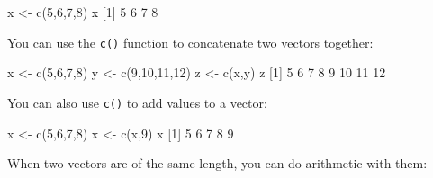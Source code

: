 \documentclass[
]{book}
\newenvironment{Shaded}{\begin{snugshade}}{\end{snugshade}}
\newcommand{\DecValTok}[1]{\textcolor[rgb]{0.00,0.00,0.81}{#1}}
\newcommand{\FunctionTok}[1]{\textcolor[rgb]{0.00,0.00,0.00}{#1}}
\newcommand{\NormalTok}[1]{#1}
\newcommand{\OtherTok}[1]{\textcolor[rgb]{0.56,0.35,0.01}{#1}}
\begin{document}
\begin{Shaded}
\begin{Highlighting}[]
\NormalTok{x }\OtherTok{\textless{}{-}} \FunctionTok{c}\NormalTok{(}\DecValTok{5}\NormalTok{,}\DecValTok{6}\NormalTok{,}\DecValTok{7}\NormalTok{,}\DecValTok{8}\NormalTok{)}
\NormalTok{x}
\NormalTok{[}\DecValTok{1}\NormalTok{] }\DecValTok{5} \DecValTok{6} \DecValTok{7} \DecValTok{8}
\end{Highlighting}
\end{Shaded}

You can use the \texttt{c()} function to concatenate two vectors together:

\begin{Shaded}
\begin{Highlighting}[]
\NormalTok{x }\OtherTok{\textless{}{-}} \FunctionTok{c}\NormalTok{(}\DecValTok{5}\NormalTok{,}\DecValTok{6}\NormalTok{,}\DecValTok{7}\NormalTok{,}\DecValTok{8}\NormalTok{)}
\NormalTok{y }\OtherTok{\textless{}{-}} \FunctionTok{c}\NormalTok{(}\DecValTok{9}\NormalTok{,}\DecValTok{10}\NormalTok{,}\DecValTok{11}\NormalTok{,}\DecValTok{12}\NormalTok{)}
\NormalTok{z }\OtherTok{\textless{}{-}} \FunctionTok{c}\NormalTok{(x,y)}
\NormalTok{z}
\NormalTok{[}\DecValTok{1}\NormalTok{]  }\DecValTok{5}  \DecValTok{6}  \DecValTok{7}  \DecValTok{8}  \DecValTok{9} \DecValTok{10} \DecValTok{11} \DecValTok{12}
\end{Highlighting}
\end{Shaded}

You can also use \texttt{c()} to add values to a vector:

\begin{Shaded}
\begin{Highlighting}[]
\NormalTok{x }\OtherTok{\textless{}{-}} \FunctionTok{c}\NormalTok{(}\DecValTok{5}\NormalTok{,}\DecValTok{6}\NormalTok{,}\DecValTok{7}\NormalTok{,}\DecValTok{8}\NormalTok{)}
\NormalTok{x }\OtherTok{\textless{}{-}} \FunctionTok{c}\NormalTok{(x,}\DecValTok{9}\NormalTok{)}
\NormalTok{x}
\NormalTok{[}\DecValTok{1}\NormalTok{] }\DecValTok{5} \DecValTok{6} \DecValTok{7} \DecValTok{8} \DecValTok{9}
\end{Highlighting}
\end{Shaded}

When two vectors are of the same length, you can do arithmetic with them:
\end{document}
